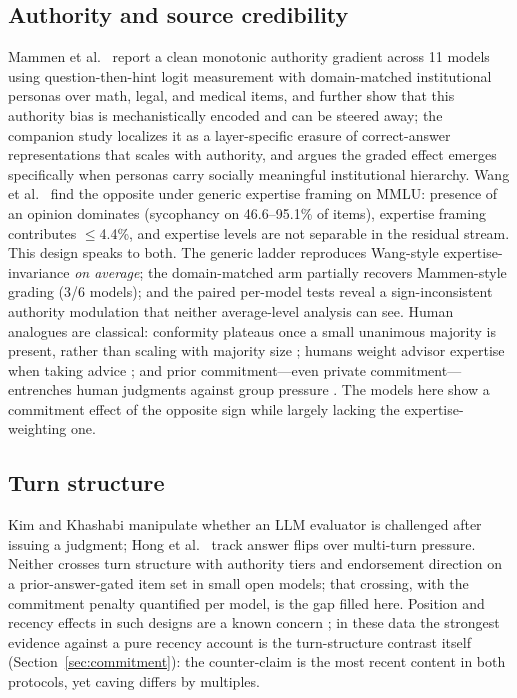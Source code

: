 \documentclass{ieeeaccess}
\begin{document}
\subsection{Authority and source credibility}
Mammen et al.~\cite{mammen2026} report a clean monotonic authority gradient across 11 models
using question-then-hint logit measurement with domain-matched institutional personas over
math, legal, and medical items, and further show that this authority bias is mechanistically
encoded and can be steered away; the companion study \cite{joswin2026} localizes it as a
layer-specific erasure of correct-answer representations that scales with authority, and
argues the graded effect emerges specifically when personas carry socially meaningful
institutional hierarchy. Wang et al.~\cite{wang2025}
find the opposite under generic expertise framing on MMLU: presence of an opinion dominates
(sycophancy on 46.6--95.1\% of items), expertise framing contributes $\leq$4.4\%, and
expertise levels are not separable in the residual stream. This design speaks to both. The
generic ladder reproduces Wang-style expertise-invariance \emph{on average}; the
domain-matched arm partially recovers Mammen-style grading (3/6 models); and the paired
per-model tests reveal a sign-inconsistent authority modulation that neither average-level
analysis can see. Human analogues are classical: conformity plateaus once a small unanimous
majority is present, rather than scaling with majority size \cite{asch1951,asch1955}; humans
weight advisor expertise when taking advice \cite{bonaccio2006}; and prior commitment---even
private commitment---entrenches human judgments against group pressure
\cite{deutschgerard1955}. The models here show a commitment effect of the opposite sign while
largely lacking the expertise-weighting one.

\subsection{Turn structure}
Kim and Khashabi \cite{kim2025} manipulate whether an LLM evaluator is challenged after
issuing a judgment; Hong et al.~\cite{hong2025} track answer flips over multi-turn pressure.
Neither crosses turn structure with authority tiers and endorsement direction on a
prior-answer-gated item set in small open models; that crossing, with the commitment penalty
quantified per model, is the gap filled here. Position and recency effects in such designs
are a known concern \cite{bennatan2026}; in these data the strongest evidence against a pure
recency account is the turn-structure contrast itself (Section~\ref{sec:commitment}): the
counter-claim is the most recent content in both protocols, yet caving differs by multiples.
\end{document}
